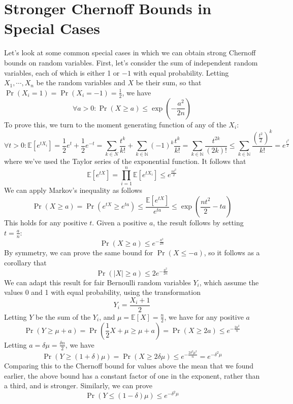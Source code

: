 \documentclass{article}
\newcommand*{\N}{\mathbb{N}}
\newcommand*{\E}{\mathbb{E}}
\begin{document}
\section{Stronger Chernoff Bounds in Special Cases}
Let's look at some common special cases in which we can obtain strong Chernoff bounds on random variables. First, let's consider the sum of independent random variables, each of which is either 1 or $ -1 $ with equal probability. Letting $ X_1, \cdots, X_n $ be the random variables and $ X $ be their sum, so that $ \Pr(X_i = 1) = \Pr(X_i = -1) = \frac{1}{2} $, we have
$$ \forall a > 0: \Pr(X \geq a) \leq \exp \left( - \frac{a^2}{2 n} \right) $$
To prove this, we turn to the moment generating function of any of the $ X_i $:
$$ \forall t > 0: \E[e^{t X_i}] = \frac{1}{2} e^t + \frac{1}{2} e^{- t} = \sum_{k \in N} \frac{t^k}{k!} + \sum_{k \in \N} (-1)^k \frac{t^k}{k!} = \sum_{k \in \N} \frac{t^{2 k}}{(2 k)!} \leq \sum_{k \in \N} \frac{\left( \frac{t^2}{2} \right)^k}{k!} = e^{\frac{t^2}{2}} $$
where we've used the Taylor series of the exponential function. It follows that
$$ \E[e^{t X}] = \prod_{i = 1}^n \E[e^{t X_i}] \leq e^{\frac{n t^2}{2}} $$
We can apply Markov's inequality as follows
$$ \Pr(X \geq a) = \Pr(e^{t X} \geq e^{t a}) \leq \frac{\E[e^{t X}]}{e^{t a}} \leq \exp \left( \frac{n t^2}{2} - t a \right) $$
This holds for any positive $ t $. Given a positive $ a $, the result follows by setting $ t = \frac{a}{n} $:
$$ \Pr(X \geq a) \leq e^{- \frac{a^2}{2 n}} $$
\qedsymbol
By symmetry, we can prove the same bound for $ \Pr(X \leq - a) $, so it follows as a corollary that
$$ \Pr(| X | \geq a) \leq 2 e^{- \frac{a^2}{2 n}} $$
We can adapt this result for fair Bernoulli random variables $ Y_i $, which assume the values 0 and 1 with equal probability, using the transformation
$$ Y_i = \frac{X_i + 1}{2} $$
Letting $ Y $ be the sum of the $ Y_i $, and $ \mu = \E[X] = \frac{n}{2} $, we have for any positive $ a $
$$ \Pr(Y \geq \mu + a) = \Pr(\frac{1}{2} X + \mu \geq \mu + a) = \Pr(X \geq 2 a) \leq e^{- \frac{2 a^2}{n}} $$
Letting $ a = \delta \mu = \frac{\delta n}{2} $, we have
$$ \Pr(Y \geq (1 + \delta) \mu) = \Pr(X \geq 2 \delta \mu) \leq e^{- \frac{2 \delta^2 \mu^2}{n}} = e^{- \delta^2 \mu} $$
Comparing this to the Chernoff bound for values above the mean that we found earlier, the above bound has a constant factor of one in the exponent, rather than a third, and is stronger. Similarly, we can prove
$$ \Pr(Y \leq (1 - \delta) \mu) \leq e^{- \delta^2 \mu} $$
\end{document}
